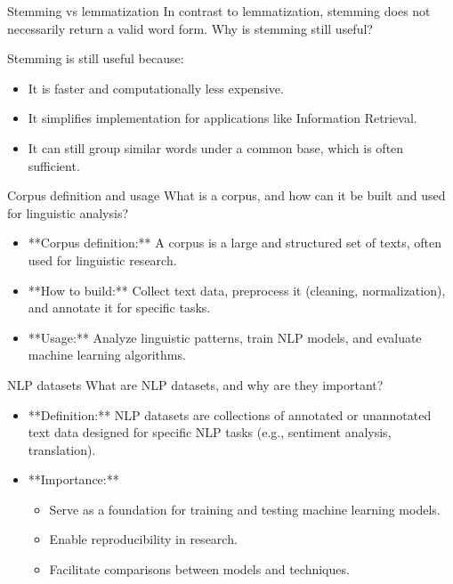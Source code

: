\documentclass{article}
\begin{document}
\begin{exercise}{Stemming vs lemmatization}
  In contrast to lemmatization, stemming does not necessarily return a valid word form. Why is stemming still useful?

  \begin{solution}
    Stemming is still useful because:
    \begin{itemize}
        \item It is faster and computationally less expensive.
        \item It simplifies implementation for applications like Information Retrieval.
        \item It can still group similar words under a common base, which is often sufficient.
    \end{itemize}
  \end{solution}
\end{exercise}

\begin{exercise}{Corpus definition and usage}
  What is a corpus, and how can it be built and used for linguistic analysis?

  \begin{solution}
    \begin{itemize}
        \item **Corpus definition:** A corpus is a large and structured set of texts, often used for linguistic research.
        \item **How to build:** Collect text data, preprocess it (cleaning, normalization), and annotate it for specific tasks.
        \item **Usage:** Analyze linguistic patterns, train NLP models, and evaluate machine learning algorithms.
    \end{itemize}
  \end{solution}
\end{exercise}

\begin{exercise}{NLP datasets}
  What are NLP datasets, and why are they important?

  \begin{solution}
    \begin{itemize}
        \item **Definition:** NLP datasets are collections of annotated or unannotated text data designed for specific NLP tasks (e.g., sentiment analysis, translation).
        \item **Importance:**
        \begin{itemize}
            \item Serve as a foundation for training and testing machine learning models.
            \item Enable reproducibility in research.
            \item Facilitate comparisons between models and techniques.
        \end{itemize}
    \end{itemize}
  \end{solution}
\end{exercise}
\end{document}
